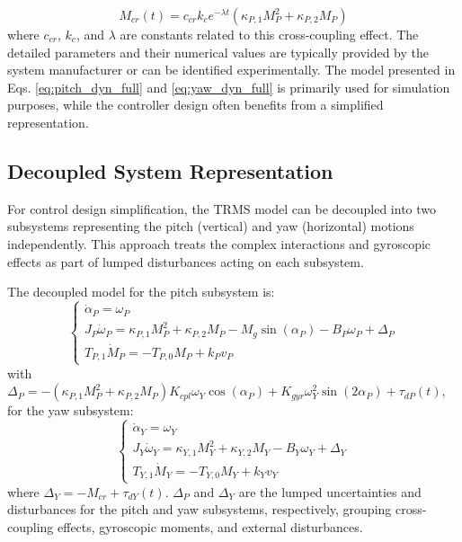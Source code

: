 \begin{equation}
    \label{eq:cross_reaction}
    M_{cr}(t) = c_{cr} k_{c} e^{-\lambda t} (\kappa_{P,1} M_{P}^2 + \kappa_{P,2} M_{P})
\end{equation}
where $c_{cr}$, $k_{c}$, and $\lambda$ are constants related to this cross-coupling effect. The detailed parameters and their numerical values are typically provided by the system manufacturer or can be identified experimentally. The model presented in Eqs. \eqref{eq:pitch_dyn_full} and \eqref{eq:yaw_dyn_full} is primarily used for simulation purposes, while the controller design often benefits from a simplified representation.

\subsection{Decoupled System Representation}
For control design simplification, the TRMS model can be decoupled into two subsystems representing the pitch (vertical) and yaw (horizontal) motions independently. This approach treats the complex interactions and gyroscopic effects as part of lumped disturbances acting on each subsystem.

The decoupled model for the pitch subsystem is:
\begin{equation}
    \label{eq:pitch_decoupled}
    \begin{cases}
        \dot{\alpha}_P = \omega_P \\
        J_P \dot{\omega}_P = \kappa_{P,1} M_{P}^2 + \kappa_{P,2} M_{P} - M_g \sin(\alpha_P) - B_P \omega_P + \Delta_P \\
        T_{P,1} \dot{M}_{P} = -T_{P,0} M_{P} + k_P v_P
    \end{cases}
\end{equation}
with $\Delta_P = -(\kappa_{P,1} M_{P}^2 + \kappa_{P,2} M_{P}) K_{cpl} \omega_Y \cos(\alpha_P) + K_{gyr} \omega_Y^2 \sin(2\alpha_P) + \tau_{dP}(t)$, for the yaw subsystem:
\begin{equation}
    \label{eq:yaw_decoupled}
    \begin{cases}
        \dot{\alpha}_Y = \omega_Y \\
        J_Y \dot{\omega}_Y = \kappa_{Y,1} M_{Y}^2 + \kappa_{Y,2} M_{Y} - B_Y \omega_Y + \Delta_Y \\
        T_{Y,1} \dot{M}_{Y} = -T_{Y,0} M_{Y} + k_Y v_Y
    \end{cases}
\end{equation}
where $\Delta_Y = -M_{cr} + \tau_{dY}(t)$.   $\Delta_P$ and $\Delta_Y$ are the lumped uncertainties and disturbances for the pitch and yaw subsystems, respectively, grouping cross-coupling effects, gyroscopic moments, and external disturbances.

